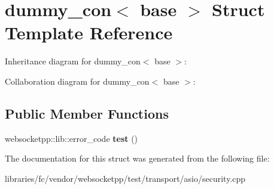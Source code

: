 \hypertarget{structdummy__con}{}\section{dummy\+\_\+con$<$ base $>$ Struct Template Reference}
\label{structdummy__con}


Inheritance diagram for dummy\+\_\+con$<$ base $>$\+:


Collaboration diagram for dummy\+\_\+con$<$ base $>$\+:
\subsection*{Public Member Functions}
\begin{DoxyCompactItemize}
\item 
\mbox{\label{structdummy__con_af921f87ae93817faa94cd48085a39ca1}} 
websocketpp\+::lib\+::error\+\_\+code {\bfseries test} ()
\end{DoxyCompactItemize}


The documentation for this struct was generated from the following file\+:\begin{DoxyCompactItemize}
\item 
libraries/fc/vendor/websocketpp/test/transport/asio/security.\+cpp\end{DoxyCompactItemize}
